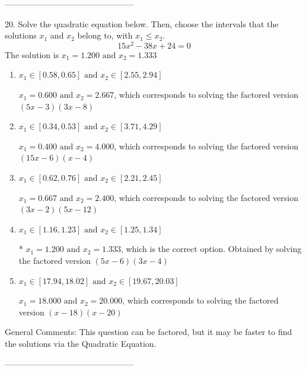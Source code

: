 \documentclass{article}[14pt]
\begin{document}
-----------------------------------------------

20. Solve the quadratic equation below. Then, choose the intervals that the solutions $x_1$ and $x_2$ belong to, with $x_1 \leq x_2$.
$$ 15x^{2} -38 x + 24 = 0 $$ 
The solution is $ x_1 = 1.200 \text{ and } x_2 = 1.333 $ 

\begin{enumerate}[label=\Alph*.] 
\item $ x_1 \in [0.58, 0.65] \text{ and } x_2 \in [2.55, 2.94] $ 

 $x_1 = 0.600 \text{ and } x_2 = 2.667$, which corresponds to solving the factored version $(5x -3)(3x -8)$ 
\item $ x_1 \in [0.34, 0.53] \text{ and } x_2 \in [3.71, 4.29] $ 

 $x_1 = 0.400 \text{ and } x_2 = 4.000$, which corresponds to solving the factored version $(15x -6)(x -4)$ 
\item $ x_1 \in [0.62, 0.76] \text{ and } x_2 \in [2.21, 2.45] $ 

 $x_1 = 0.667 \text{ and } x_2 = 2.400$, which corresponds to solving the factored version $(3x -2)(5x -12)$ 
\item $ x_1 \in [1.16, 1.23] \text{ and } x_2 \in [1.25, 1.34] $ 

 * $x_1 = 1.200 \text{ and } x_2 = 1.333$, which is the correct option. Obtained by solving the factored version $(5x -6)(3x -4)$ 
\item $ x_1 \in [17.94, 18.02] \text{ and } x_2 \in [19.67, 20.03] $ 

 $x_1 = 18.000 \text{ and } x_2 = 20.000$, which corresponds to solving the factored version $(x -18)(x -20)$ 
\end{enumerate} 
 
General Comments: This question can be factored, but it may be faster to find the solutions via the Quadratic Equation.

-----------------------------------------------
\end{document}
